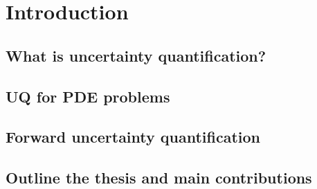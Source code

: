 \chapter{Introduction}\label{ch:introduction}


\section{What is uncertainty quantification?}\label{sec:what-is-uq?}


\section{UQ for PDE problems}\label{sec:uq-for-pde-problems}


\section{Forward uncertainty quantification}\label{sec:forward-uncertainty-quantification}


\section{Outline the thesis and main contributions}\label{sec:computational-bottlenecks}



\clearpage\null\newpage\null\thispagestyle{empty}
